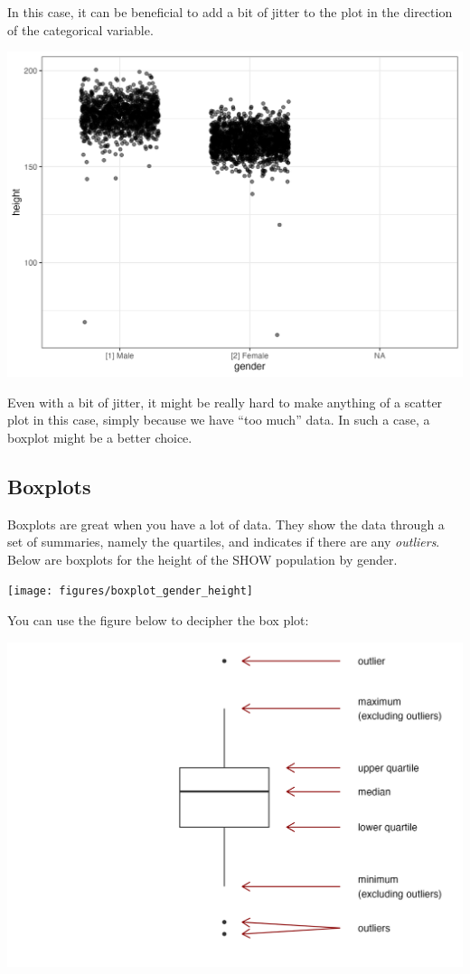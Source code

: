 \documentclass[]{book}
\theoremstyle{definition}
\theoremstyle{definition}
\theoremstyle{definition}
\theoremstyle{remark}
\begin{document}
In this case, it can be beneficial to add a bit of jitter to the plot in the direction of the categorical variable.

\includegraphics[width=27.08in]{figures/jitter_gender_height}

Even with a bit of jitter, it might be really hard to make anything of a scatter plot in this case, simply because we have ``too much'' data. In such a case, a boxplot might be a better choice.

\hypertarget{boxplots}{%
\subsection{Boxplots}\label{boxplots}}

Boxplots are great when you have a lot of data. They show the data through a set of summaries, namely the quartiles, and indicates if there are any \emph{outliers}. Below are boxplots for the height of the SHOW population by gender.

\texttt{[image: figures/boxplot\_gender\_height]}

You can use the figure below to decipher the box plot:

\includegraphics[width=27.08in]{figures/boxplot_explanation}
\end{document}
